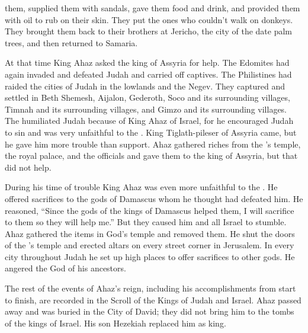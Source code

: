 {them, supplied them with sandals,
gave them food
and drink,
and provided them with oil
to rub on their skin. They put
the ones
who couldn’t walk
on donkeys.
They brought
them back to their brothers
at Jericho,
the city
of the date
palm trees, and then returned
to Samaria.
\par }{\PP {}At that time
King
Ahaz
asked
the king
of Assyria
for help.
The Edomites
had again
invaded
and defeated
Judah
and carried
off captives.
The Philistines
had raided
the cities
of Judah
in the lowlands
and the Negev.
They captured
and settled
in Beth Shemesh,
Aijalon,
Gederoth,
Soco
and its surrounding villages,
Timnah
and its surrounding villages,
and Gimzo
and its surrounding villages.
The
{}
humiliated
Judah
because
of King
Ahaz
of Israel,
for
he encouraged
Judah
to sin and was very unfaithful
to the
{}.
King
Tiglath-pileser
of Assyria
came,
but he gave him more trouble than support.
Ahaz
gathered
riches
from the
{}’s
temple,
the royal
palace,
and the officials
and gave
them to the king
of Assyria,
but that did not
help.
\par }{\PP {}During his time
of trouble
King
Ahaz
was even more
unfaithful
to the
{}.
He offered sacrifices
to the gods
of Damascus
whom he thought had defeated
him. He reasoned, “Since
the gods
of the kings
of Damascus
helped
them, I will sacrifice
to them so they will help
me.” But they
caused
him and all
Israel
to stumble.
Ahaz
gathered
the items
in God’s
temple
and removed
them. He shut
the doors
of the
{}’s
temple
and erected
altars
on every
street corner
in Jerusalem.
In every
city
throughout Judah
he set up high places
to offer
sacrifices to other
gods.
He angered
the {}
God
of his ancestors.
\par }{\PP {}The rest
of the events
of Ahaz’s
reign, including his accomplishments from start
to finish,
are recorded
in the Scroll
of the Kings
of Judah
and Israel.
Ahaz
passed away
and was buried
in the City of David;
they did not
bring
him to the tombs
of the kings
of Israel.
His son
Hezekiah
replaced
him as king.

}
